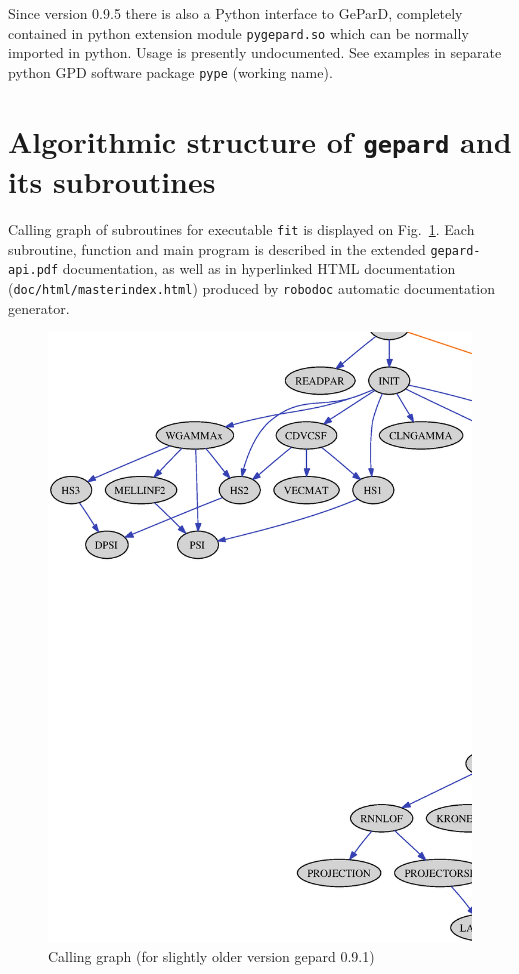 \documentclass[12pt]{article}
\begin{document}
Since version 0.9.5 there is also a Python interface to GeParD, completely
contained in python extension module \texttt{pygepard.so} which can be
normally imported in python. Usage is presently undocumented. See 
examples in separate python GPD software package \texttt{pype} (working name).

\section{Algorithmic structure of \texttt{gepard} and its subroutines}

Calling graph of subroutines for executable \texttt{fit} is displayed on
Fig.~\ref{fig:callgraph}. Each subroutine,
function and main program is described in the extended \texttt{gepard-api.pdf} documentation,
as well as in hyperlinked HTML documentation 
(\texttt{doc/html/masterindex.html}) produced by 
\texttt{robodoc} automatic documentation generator.

\begin{figure}[ht]
\begin{center}
\includegraphics[scale=0.52]{callgraph}
\end{center}
\caption{Calling graph (for slightly older version gepard 0.9.1)}
\label{fig:callgraph}
\end{figure}




%

%

\end{document}
